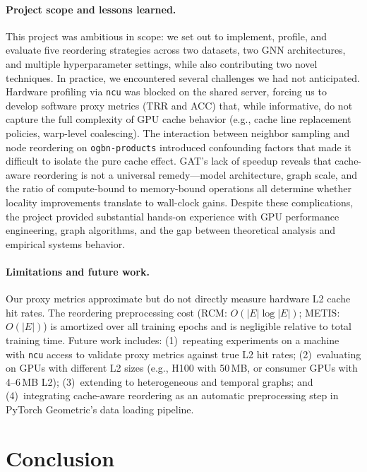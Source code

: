 \documentclass[sigconf,review]{acmart}
\begin{document}
\paragraph{Project scope and lessons learned.}
This project was ambitious in scope: we set out to implement, profile, and evaluate five reordering strategies across two datasets, two GNN architectures, and multiple hyperparameter settings, while also contributing two novel techniques.
In practice, we encountered several challenges we had not anticipated.
Hardware profiling via \texttt{ncu} was blocked on the shared server, forcing us to develop software proxy metrics (TRR and ACC) that, while informative, do not capture the full complexity of GPU cache behavior (e.g., cache line replacement policies, warp-level coalescing).
The interaction between neighbor sampling and node reordering on \texttt{ogbn-products} introduced confounding factors that made it difficult to isolate the pure cache effect.
GAT's lack of speedup reveals that cache-aware reordering is not a universal remedy---model architecture, graph scale, and the ratio of compute-bound to memory-bound operations all determine whether locality improvements translate to wall-clock gains.
Despite these complications, the project provided substantial hands-on experience with GPU performance engineering, graph algorithms, and the gap between theoretical analysis and empirical systems behavior.

\paragraph{Limitations and future work.}
Our proxy metrics approximate but do not directly measure hardware L2 cache hit rates.
The reordering preprocessing cost (RCM: $O(|E|\log|E|)$; METIS: $O(|E|)$) is amortized over all training epochs and is negligible relative to total training time.
Future work includes: (1)~repeating experiments on a machine with \texttt{ncu} access to validate proxy metrics against true L2 hit rates; (2)~evaluating on GPUs with different L2 sizes (e.g., H100 with 50\,MB, or consumer GPUs with 4--6\,MB L2); (3)~extending to heterogeneous and temporal graphs; and (4)~integrating cache-aware reordering as an automatic preprocessing step in PyTorch Geometric's data loading pipeline.

\section{Conclusion}
\label{sec:conclusion}
\end{document}

